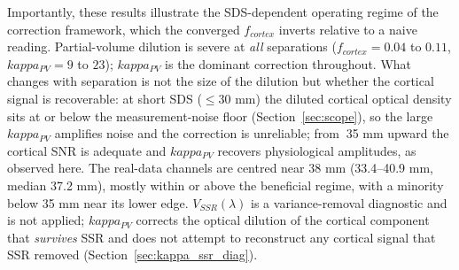 \documentclass[11pt]{article}
\def\kappa{kappa}%
\def\sim{~}%
\def\mathrm#1{#1}%
\def\,{ }%
\begin{document}
Importantly, these results illustrate the SDS-dependent operating regime of the correction framework, which the converged $f_{\mathrm{cortex}}$ inverts relative to a naive reading. Partial-volume dilution is severe at \emph{all} separations ($f_{\mathrm{cortex}} = 0.04$ to $0.11$, $\kappa_{\mathrm{PV}} = 9$ to $23$); $\kappa_{\mathrm{PV}}$ is the dominant correction throughout. What changes with separation is not the size of the dilution but whether the cortical signal is recoverable: at short SDS ($\leq$30\,mm) the diluted cortical optical density sits at or below the measurement-noise floor (Section~\ref{sec:scope}), so the large $\kappa_{\mathrm{PV}}$ amplifies noise and the correction is unreliable; from $\sim$35\,mm upward the cortical SNR is adequate and $\kappa_{\mathrm{PV}}$ recovers physiological amplitudes, as observed here. The real-data channels are centred near 38\,mm (33.4--40.9\,mm, median 37.2\,mm), mostly within or above the beneficial regime, with a minority below 35\,mm near its lower edge. $V_{\mathrm{SSR}}(\lambda)$ is a variance-removal diagnostic and is not applied; $\kappa_{\mathrm{PV}}$ corrects the optical dilution of the cortical component that \emph{survives} SSR and does not attempt to reconstruct any cortical signal that SSR removed (Section~\ref{sec:kappa_ssr_diag}).
\end{document}
